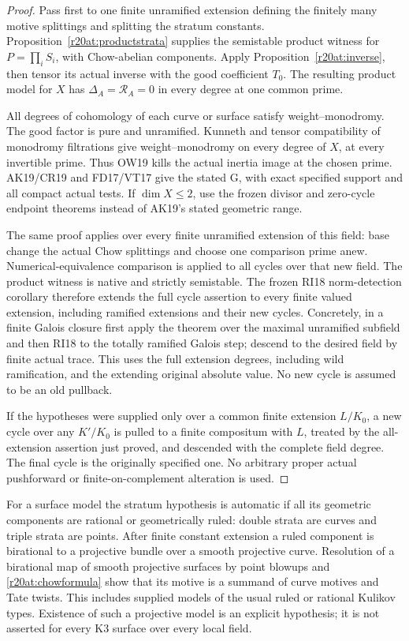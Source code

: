 \begin{proof}
Pass first to one finite unramified extension defining the finitely
many motive splittings and splitting the stratum constants.
Proposition~\ref{r20at:productstrata} supplies the semistable
product witness for $P=\prod_iS_i$, with Chow-abelian components.
Apply Proposition~\ref{r20at:inverse}, then tensor its actual
inverse with the good coefficient $T_0$.  The resulting product
model for $X$ has $\Delta_A=\mathscr R_A=0$ in every degree
at one common prime.

All degrees of cohomology of each curve or surface satisfy
weight--monodromy.  The good factor is pure and unramified.
Kunneth and tensor compatibility of monodromy filtrations give
weight--monodromy on every degree of $X$, at every invertible
prime.  Thus OW19 kills the actual inertia image at the chosen
prime.  AK19/CR19 and FD17/VT17 give the stated G, with exact
specified support and all compact actual tests.  If $\dim X\le2$,
use the frozen divisor and zero-cycle endpoint theorems instead
of AK19's stated geometric range.

The same proof applies over every finite unramified extension of
this field: base change the actual Chow splittings and choose one
comparison prime anew.  Numerical-equivalence comparison is
applied to all cycles over that new field.  The product witness
is native and strictly semistable.  The frozen RI18 norm-detection
corollary therefore extends the full cycle assertion to every
finite valued extension, including ramified extensions and their
new cycles.  Concretely, in a finite Galois closure first apply
the theorem over the maximal unramified subfield and then RI18
to the totally ramified Galois step; descend to the desired
field by finite actual trace.  This uses the full extension
degrees, including wild ramification, and the extending original
absolute value.  No new cycle is assumed to be an old pullback.

If the hypotheses were supplied only over a common finite
extension $L/K_0$, a new cycle over any $K'/K_0$ is pulled to a
finite compositum with $L$, treated by the all-extension assertion
just proved, and descended with the complete field degree.  The
final cycle is the originally specified one.  No arbitrary proper
actual pushforward or finite-on-complement alteration is used.
\end{proof}

For a surface model the stratum hypothesis is automatic if all
its geometric components are rational or geometrically ruled:
double strata are curves and triple strata are points.  After
finite constant extension a ruled component is birational to a
projective bundle over a smooth projective curve.  Resolution of
a birational map of smooth projective surfaces by point blowups
and \eqref{r20at:chowformula} show that its motive is a summand
of curve motives and Tate twists.  This includes supplied models
of the usual ruled or rational Kulikov types.  Existence of such
a projective model is an explicit hypothesis; it is not asserted
for every K3 surface over every local field.

